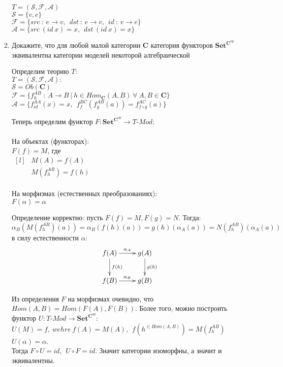 \documentclass[draft]{article}
\newcommand{\cat}[1]{\mathbf{#1}}
\renewcommand{\C}{\cat{C}}
\newcommand{\Set}{\cat{Set}}
\newcommand{\fs}[1]{\mathrm{#1}}
\begin{document}
\begin{enumerate}
$T = (\mathcal{S},\mathcal{F}, \mathcal{A})$\\
$\mathcal{S} = \{v, e\}$\\
$\mathcal{F} = \{src~:~e\to v,~~dst ~:~ e \to v, ~~ id ~:~ v \to e\}$\\
$\mathcal{A} = \{ src ~(id~x) = x,~~ dst ~(id~x) = x\}$

\item Докажите, что для любой малой категории $\C$ категория функторов $\Set^{\C^\fs{op}}$ эквивалентна категории моделей некоторой алгебраической 

Определим теорию $T$:\\
$T = (\mathcal{S}, \mathcal{F}, \mathcal{A}):$\\
$\mathcal{S} = Ob(\C)$\\
$\mathcal{F} = \{f_h^{AB}~:~ A \to B ~|~ h \in Hom_\C(A, B)~\forall~A,B\in\C\}$\\
$\mathcal{A} = \{f_{id}^{AA}(x) = x,~~f_f^{BC}(f_g^{AB}(a)) = f_{f\circ g}^{AC}(a)\}$

Теперь определим функтор $F : \Set^{\C^{op}} \to T\text{-}Mod$:\\\\
На объектах (функторах):\\
$F(f) = M$, где \\
$
\begin{matrix*}[l]
&M(A) = f(A)\\
&M(f_h^{AB}) = f(h)
\end{matrix*}
$\\\\
На морфизмах (естественных преобразованиях):\\
$F(\alpha) = \alpha$	

Определение корректно: пусть $F(f) = M, F(g) = N$. Тогда:\\
$\alpha_B(M(f_h^{AB})(a)) = \alpha_B(f(h)(a)) = g(h)(\alpha_A(a)) = N(f_h^{AB})(\alpha_A(a))$\\
в силу естественности $\alpha$:
\[
\xymatrix{
f(A) \ar[r]^{\alpha_A} \ar[d]^{f(h)} & g(A) \ar[d]^{g(h)}\\
f(B) \ar[r]^{\alpha_B} & g(B) \\
}
\]

Из определения $F$ на морфизмах очевидно, что \\$Hom(A, B) = Hom(F(A), F(B))$. Более того, можно построить функтор $U:  T\text{-}Mod \to \Set^{\C^{op}}$:\\
$U(M) = f, ~wehre~f(A) = M(A),~~f(h^{\in Hom(A, B)}) = M(f_h^{AB})$\\
$U(\alpha) = \alpha$.\\
Тогда $F\circ U = id, ~~U \circ F = id$. Значит категории изоморфны, а значит и эквивалентны.



\end{enumerate}
\end{document}
